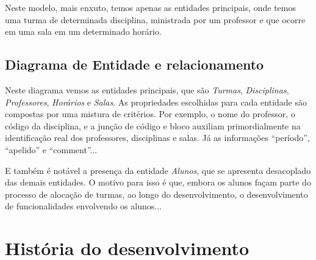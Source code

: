 

Neste modelo, mais enxuto, temos apenas as entidades principais, onde temos uma turma de determinada disciplina, ministrada por um professor e que ocorre em uma sala em um determinado horário.

\subsection{Diagrama de Entidade e relacionamento} %



Neste diagrama vemos as entidades principais, que são \textit{Turmas}, \textit{Disciplinas}, \textit{Professores}, \textit{Horários} e \textit{Salas}. As propriedades escolhidas para cada entidade são compostas por uma mistura de critérios. Por exemplo, o nome do professor, o código da disciplina, e a junção de código e bloco auxiliam primordialmente na identificação real dos professores, disciplinas e salas. Já as informações ``período'', ``apelido'' e ``comment''...

E também é notável a presença da entidade \textit{Alunos}, que se apresenta desacoplado das demais entidades. O motivo para isso é que, embora os alunos façam parte do processo de alocação de turmas, ao longo do desenvolvimento, o desenvolvimento de funcionalidades envolvendo os alunos...

\section{História do desenvolvimento} %

